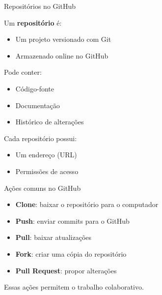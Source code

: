 \documentclass{beamer}
\begin{document}
\begin{frame}{Repositórios no GitHub}
    
    Um \textbf{repositório} é:
    \begin{itemize}
        \item Um projeto versionado com Git
        \item Armazenado online no GitHub
    \end{itemize}
    
    \vspace{0.3cm}
    
    Pode conter:
    \begin{itemize}
        \item Código-fonte
        \item Documentação
        \item Histórico de alterações
    \end{itemize}
    
    \vspace{0.3cm}
    
    Cada repositório possui:
    \begin{itemize}
        \item Um endereço (URL)
        \item Permissões de acesso
    \end{itemize}
    
\end{frame}

\begin{frame}{Ações comuns no GitHub}
    
    \begin{itemize}
        \item \textbf{Clone}: baixar o repositório para o computador
        \item \textbf{Push}: enviar commits para o GitHub
        \item \textbf{Pull}: baixar atualizações
        \item \textbf{Fork}: criar uma cópia do repositório
        \item \textbf{Pull Request}: propor alterações
    \end{itemize}
    
    \vspace{0.3cm}
    
    Essas ações permitem o trabalho colaborativo.
    
\end{frame}
\end{document}
